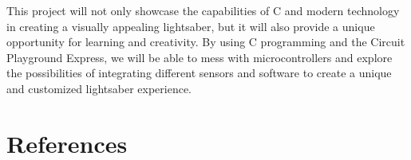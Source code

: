 \documentclass[12pt]{article}
\begin{document}
This project will not only showcase the capabilities of C and modern technology in creating a visually appealing lightsaber, but it will also provide a unique opportunity for learning and creativity. By using C programming and the Circuit Playground Express, we will be able to mess with microcontrollers and explore the possibilities of integrating different sensors and software to create a unique and customized lightsaber experience.
\newpage
\section{References}
\printbibliography[heading=subbibintoc]
%
%
\end{document}
